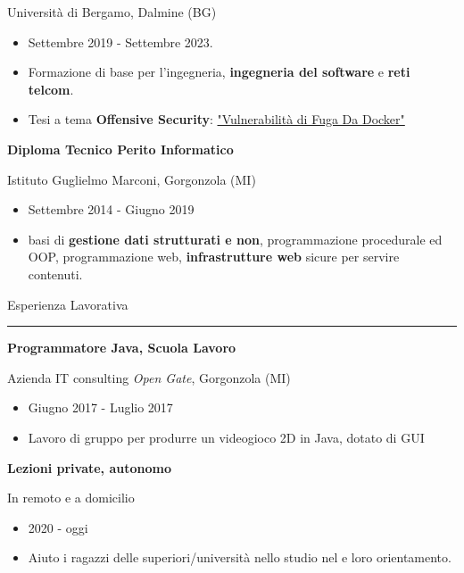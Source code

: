\documentclass[a4paper]{letter}
\begin{document}
\begin{minipage}[t]{0.65\textwidth}
{\small Università di Bergamo, Dalmine (BG)}
\begin{itemize}
    \item Settembre 2019 - Settembre 2023.
\item Formazione di base per l'ingegneria, \textbf{ingegneria del software} e \textbf{reti telcom}. 
\item Tesi a tema \textbf{Offensive Security}: \href{https://github.com/giorgio-hash/tesi-triennio}{"Vulnerabilità di Fuga Da Docker"}
 \end{itemize}

{\large \textbf{Diploma Tecnico Perito Informatico}}

{\small Istituto Guglielmo Marconi, Gorgonzola (MI)}
\begin{itemize}
    \item Settembre 2014 - Giugno 2019
    \item basi di \textbf{gestione dati strutturati e non}, programmazione procedurale ed OOP, programmazione web, \textbf{infrastrutture web} sicure per servire contenuti.
\end{itemize}

\vspace{0.5cm}

{\large Esperienza Lavorativa}
\rule{\linewidth}{0.4pt}

{\large \textbf{Programmatore Java, Scuola Lavoro}}

{\small  Azienda IT consulting \textit{Open Gate}, Gorgonzola (MI)}

\begin{itemize}
    \item Giugno 2017 - Luglio 2017
    \item Lavoro di gruppo per produrre un videogioco 2D in Java, dotato di GUI
\end{itemize}

{\large \textbf{Lezioni private, autonomo}}

{\small In remoto e a domicilio}

\begin{itemize}
    \item 2020 - oggi
    \item Aiuto i ragazzi delle superiori/università nello studio nel e loro orientamento.
\end{itemize}

\end{minipage}
\end{document}
